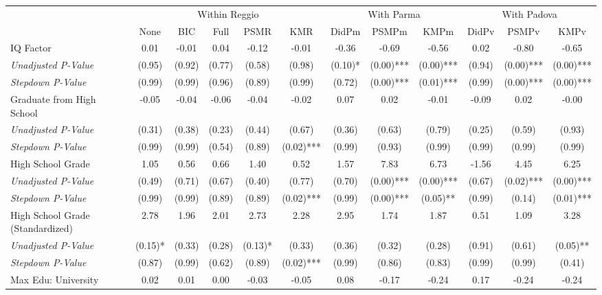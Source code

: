 \begin{tabular}{l c c c c c c c c c c c}
\toprule
& \multicolumn{5}{c}{Within Reggio} & \multicolumn{3}{c}{With Parma} & \multicolumn{3}{c}{With Padova} \\\cmidrule(lr){2-6} \cmidrule(lr){7-9} \cmidrule(lr){10-12}
 & None & BIC & Full & PSMR & KMR & DidPm & PSMPm & KMPm & DidPv & PSMPv & KMPv \\
\midrule
IQ Factor & 0.01 & -0.01 & 0.04 & -0.12 & -0.01 & -0.36 & -0.69 & -0.56 & 0.02 & -0.80 & -0.65 \\
\quad \textit{Unadjusted P-Value} & (0.95) & (0.92) & (0.77) & (0.58) & (0.98) & (0.10)* & (0.00)*** & (0.00)*** & (0.94) & (0.00)*** & (0.00)*** \\
\quad \textit{Stepdown P-Value} & (0.99) & (0.99) & (0.96) & (0.89) & (0.99) & (0.72) & (0.00)*** & (0.01)*** & (0.99) & (0.00)*** & (0.00)*** \\
Graduate from High School & -0.05 & -0.04 & -0.06 & -0.04 & -0.02 & 0.07 & 0.02 & -0.01 & -0.09 & 0.02 & -0.00 \\
\quad \textit{Unadjusted P-Value} & (0.31) & (0.38) & (0.23) & (0.44) & (0.67) & (0.36) & (0.63) & (0.79) & (0.25) & (0.59) & (0.93) \\
\quad \textit{Stepdown P-Value} & (0.99) & (0.99) & (0.54) & (0.89) & (0.02)*** & (0.99) & (0.93) & (0.99) & (0.99) & (0.99) & (0.99) \\
High School Grade & 1.05 & 0.56 & 0.66 & 1.40 & 0.52 & 1.57 & 7.83 & 6.73 & -1.56 & 4.45 & 6.25 \\
\quad \textit{Unadjusted P-Value} & (0.49) & (0.71) & (0.67) & (0.40) & (0.77) & (0.70) & (0.00)*** & (0.00)*** & (0.67) & (0.02)*** & (0.00)*** \\
\quad \textit{Stepdown P-Value} & (0.99) & (0.99) & (0.89) & (0.89) & (0.02)*** & (0.99) & (0.00)*** & (0.05)** & (0.99) & (0.14) & (0.01)*** \\
High School Grade (Standardized) & 2.78 & 1.96 & 2.01 & 2.73 & 2.28 & 2.95 & 1.74 & 1.87 & 0.51 & 1.09 & 3.28 \\
\quad \textit{Unadjusted P-Value} & (0.15)* & (0.33) & (0.28) & (0.13)* & (0.33) & (0.36) & (0.32) & (0.28) & (0.91) & (0.61) & (0.05)** \\
\quad \textit{Stepdown P-Value} & (0.87) & (0.99) & (0.62) & (0.89) & (0.02)*** & (0.99) & (0.86) & (0.83) & (0.99) & (0.99) & (0.41) \\
Max Edu: University & 0.02 & 0.01 & 0.00 & -0.03 & -0.05 & 0.08 & -0.17 & -0.24 & 0.17 & -0.24 & -0.24 \\

\end{tabular}
